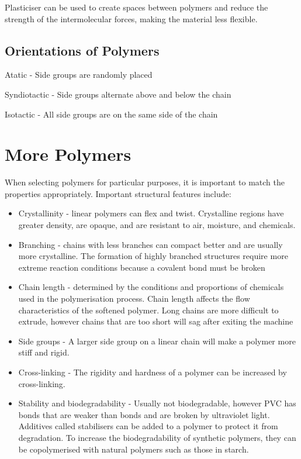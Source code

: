 	Plasticiser can be used to create spaces between polymers and reduce the strength of the intermolecular forces, making the material less flexible.

	\subsection{Orientations of Polymers}
	
		Atatic - Side groups are randomly placed

		Syndiotactic - Side groups alternate above and below the chain

		Isotactic - All side groups are on the same side of the chain


\section{More Polymers}

	When selecting polymers for particular purposes, it is important to match the properties appropriately. Important structural features include:

	\begin{itemize}
		\item Crystallinity - linear polymers can flex and twist. Crystalline regions have greater density, are opaque, and are resistant to air, moisture, and chemicals.
		\item Branching - chains with less branches can compact better and are usually more crystalline. The formation of highly branched structures require more extreme reaction conditions because a covalent bond must be broken
		\item Chain length - determined by the conditions and proportions of chemicals used in the polymerisation process. Chain length affects the flow characteristics of the softened polymer. Long chains are more difficult to extrude, however chains that are too short will sag after exiting the machine
		\item Side groups - A larger side group on a linear chain will make a polymer more stiff and rigid.
		\item Cross-linking - The rigidity and hardness of a polymer can be increased by cross-linking.
		\item Stability and biodegradability - Usually not biodegradable, however PVC has  bonds that are weaker than  bonds and are broken by ultraviolet light. Additives called stabilisers can be added to a polymer to protect it from degradation. To increase the biodegradability of synthetic polymers, they can be copolymerised with natural polymers such as those in starch.
	\end{itemize}

